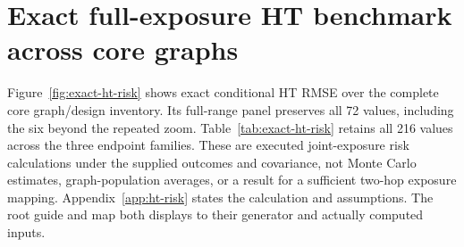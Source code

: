 \clearpage
\section{Exact full-exposure HT benchmark across core graphs}
\label{app:benchmark}
Figure~\ref{fig:exact-ht-risk} shows exact conditional HT RMSE over the complete core graph/design inventory. Its full-range panel preserves all 72 values, including the six beyond the repeated zoom. Table~\ref{tab:exact-ht-risk} retains all 216 values across the three endpoint families. These are executed joint-exposure risk calculations under the supplied outcomes and covariance, not Monte Carlo estimates, graph-population averages, or a result for a sufficient two-hop exposure mapping. Appendix~\ref{app:ht-risk} states the calculation and assumptions. The root guide and  map both displays to their generator and actually computed inputs.


\clearpage
